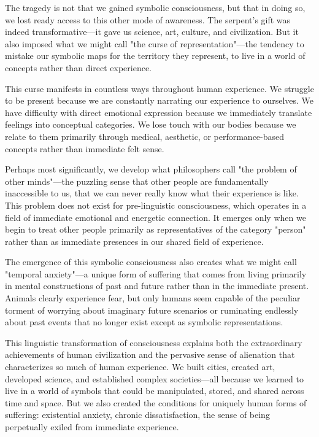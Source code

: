 The tragedy is not that we gained symbolic consciousness, but that in doing so, we lost ready access to this other mode of awareness. The serpent's gift was indeed transformative—it gave us science, art, culture, and civilization. But it also imposed what we might call "the curse of representation"—the tendency to mistake our symbolic maps for the territory they represent, to live in a world of concepts rather than direct experience.

This curse manifests in countless ways throughout human experience. We struggle to be present because we are constantly narrating our experience to ourselves. We have difficulty with direct emotional expression because we immediately translate feelings into conceptual categories. We lose touch with our bodies because we relate to them primarily through medical, aesthetic, or performance-based concepts rather than immediate felt sense.

Perhaps most significantly, we develop what philosophers call "the problem of other minds"—the puzzling sense that other people are fundamentally inaccessible to us, that we can never really know what their experience is like. This problem does not exist for pre-linguistic consciousness, which operates in a field of immediate emotional and energetic connection. It emerges only when we begin to treat other people primarily as representatives of the category "person" rather than as immediate presences in our shared field of experience.

The emergence of this symbolic consciousness also creates what we might call "temporal anxiety"—a unique form of suffering that comes from living primarily in mental constructions of past and future rather than in the immediate present. Animals clearly experience fear, but only humans seem capable of the peculiar torment of worrying about imaginary future scenarios or ruminating endlessly about past events that no longer exist except as symbolic representations.

This linguistic transformation of consciousness explains both the extraordinary achievements of human civilization and the pervasive sense of alienation that characterizes so much of human experience. We built cities, created art, developed science, and established complex societies—all because we learned to live in a world of symbols that could be manipulated, stored, and shared across time and space. But we also created the conditions for uniquely human forms of suffering: existential anxiety, chronic dissatisfaction, the sense of being perpetually exiled from immediate experience.


